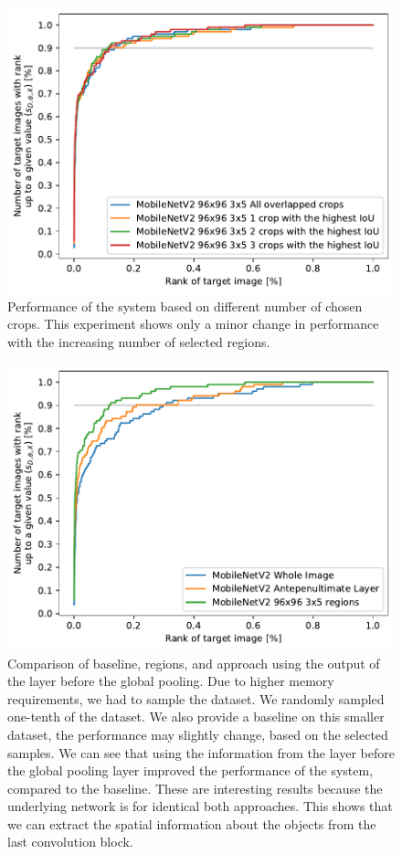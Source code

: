 \begin{figure}
\centering
\includegraphics[width=0.8\linewidth]{graphs/5c4a781f8e6f3eac93db2083bde3963c06582a92a8141411bf29e41251a98e75.pdf}
\caption[Performance of the system based on different number of chosen crops]{Performance of the system based on different number of chosen crops. This experiment shows only a minor change in performance with the increasing number of selected regions.}
\label{fig:crop_limitation}
\end{figure}

\begin{figure}
    \centering
    \includegraphics[width=0.8\linewidth]{graphs/adaf8d435bb40406f9ce40654ec396e04453ab76cf0776d2a87d385055d5424f.pdf}
    \caption[Comparison of baseline, regions, and approach using the output of the layer before the global pooling]{Comparison of baseline, regions, and approach using the output of the layer before the global pooling. Due to higher memory requirements, we had to sample the dataset. We randomly sampled one-tenth of the dataset. We also provide a baseline on this smaller dataset, the performance may slightly change, based on the selected samples. We can see that using the information from the layer before the global pooling layer improved the performance of the system, compared to the baseline. These are interesting results because the underlying network is for identical both approaches. This shows that we can extract the spatial information about the objects from the last convolution block.}
    \label{fig:antepenultimate}
\end{figure}

